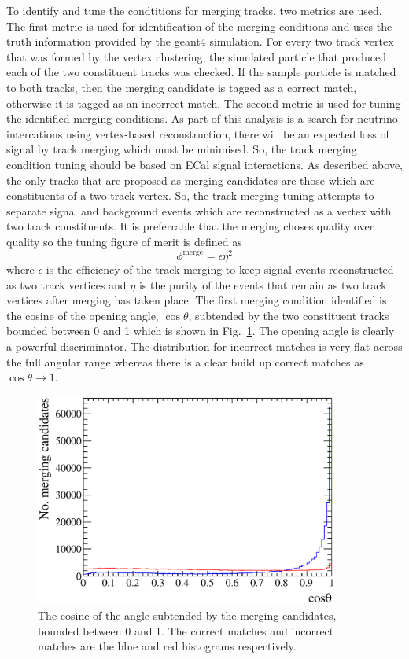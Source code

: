To identify and tune the condtitions for merging tracks, two metrics are used.  The first metric is used for identification of the merging conditions and uses the truth information provided by the geant4 simulation.  For every two track vertex that was formed by the vertex clustering, the simulated particle that produced each of the two constituent tracks was checked.  If the sample particle is matched to both tracks, then the merging candidate is tagged as a correct match, otherwise it is tagged as an incorrect match.  The second metric is used for tuning the identified merging conditions.  As part of this analysis is a search for neutrino intercations using vertex-based reconstruction, there will be an expected loss of signal by track merging which must be minimised.  So, the track merging condition tuning should be based on ECal signal interactions.  As described above, the only tracks that are proposed as merging candidates are those which are constituents of a two track vertex.  So, the track merging tuning attempts to separate signal and background events which are reconstructed as a vertex with two track constituents.  It is preferrable that the merging choses quality over quality so the tuning figure of merit is defined as 
\begin{equation}
  \phi^{\textrm{merge}} = \epsilon \eta^2
  \label{eqn:TrackMergingTuningMetric}
\end{equation}
where $\epsilon$ is the efficiency of the track merging to keep signal events reconstructed as two track vertices and $\eta$ is the purity of the events that remain as two track vertices after merging has taken place.
\newline
\newline
The first merging condition identified is the cosine of the opening angle, $\cos\theta$, subtended by the two constituent tracks bounded between 0 and 1 which is shown in Fig.~\ref{fig:TrackMergingConditionCosTheta}.  The opening angle is clearly a powerful discriminator.  The distribution for incorrect matches is very flat across the full angular range whereas there is a clear build up correct matches as $\cos\theta \rightarrow 1$.
\begin{figure}[!b]
  \centering
  \includegraphics[width=10cm]{images/selection/vertex_recon/merging_candidates_cos_theta}
  \caption{The cosine of the angle subtended by the merging candidates, bounded between 0 and 1. The correct matches and incorrect matches are the blue and red histograms respectively.}
  \label{fig:TrackMergingConditionCosTheta}
\end{figure}
